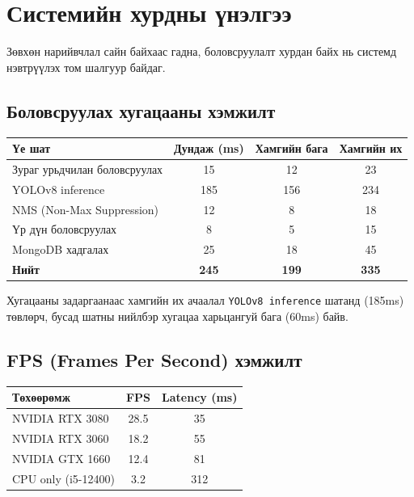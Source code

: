 \section{Системийн хурдны үнэлгээ}

Зөвхөн нарийвчлал сайн байхаас гадна, боловсруулалт хурдан байх нь системд нэвтрүүлэх том шалгуур байдаг.

\subsection{Боловсруулах хугацааны хэмжилт}

\begin{table}[H]
\centering
\caption{Системийн боловсруулах хурдны үнэлгээ}
\label{tab:speed_results}
\begin{longtable}{|l|c|c|c|}
\hline
\textbf{Үе шат} & \textbf{Дундаж (ms)} & \textbf{Хамгийн бага} & \textbf{Хамгийн их} \\
\hline
Зураг урьдчилан боловсруулах & 15 & 12 & 23 \\
\hline
YOLOv8 inference & 185 & 156 & 234 \\
\hline
NMS (Non-Max Suppression) & 12 & 8 & 18 \\
\hline
Үр дүн боловсруулах & 8 & 5 & 15 \\
\hline
MongoDB хадгалах & 25 & 18 & 45 \\
\hline
\textbf{Нийт} & \textbf{245} & \textbf{199} & \textbf{335} \\
\hline
\end{longtable}
\end{table}

Хугацааны задаргаанаас хамгийн их ачаалал \texttt{YOLOv8 inference} шатанд (185ms) төвлөрч, бусад шатны нийлбэр хугацаа харьцангуй бага (60ms) байв.

\subsection{FPS (Frames Per Second) хэмжилт}

\begin{table}[H]
\centering
\caption{FPS хэмжилт янз бүрийн төхөөрөмж дээр}
\label{tab:fps_results}
\begin{longtable}{|l|c|c|}
\hline
\textbf{Төхөөрөмж} & \textbf{FPS} & \textbf{Latency (ms)} \\
\hline
NVIDIA RTX 3080 & 28.5 & 35 \\
\hline
NVIDIA RTX 3060 & 18.2 & 55 \\
\hline
NVIDIA GTX 1660 & 12.4 & 81 \\
\hline
CPU only (i5-12400) & 3.2 & 312 \\
\hline
\end{longtable}
\end{table}

